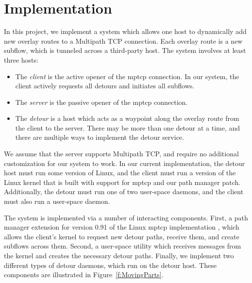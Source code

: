 \documentclass{cwru}
\begin{document}
\chapter{Implementation}
\label{c:impl}


In this project, we implement a system which allows one host to dynamically add
new overlay routes to a Multipath TCP connection. Each overlay route is a new
subflow, which is tunneled across a third-party host. The system involves at
least three hosts:
\begin{itemize}
\item The \emph{client} is the active opener of the \ac{mptcp} connection. In
  our system, the client actively requests all detours and initiates all
  subflows.
\item The \emph{server} is the passive opener of the \ac{mptcp} connection.
\item The \emph{detour} is a host which acts as a waypoint along the overlay
  route from the client to the server. There may be more than one detour at a
  time, and there are multiple ways to implement the detour service.
\end{itemize}

We assume that the server supports Multipath TCP, and require no additional
customization for our system to work. In our current implementation, the detour
host must run some version of Linux, and the client must run a version of the
Linux kernel that is built with support for \ac{mptcp} and our path manager
patch. Additionally, the detour must run one of two user-space daemons, and the
client must also run a user-space daemon.

The system is implemented via a number of interacting components. First, a path
manager extension for version 0.91 of the Linux \ac{mptcp} implementation
\cite{mptcp}, which allows the client's kernel to request new detour paths,
receive them, and create subflows across them. Second, a user-space utility
which receives messages from the kernel and creates the necessary detour paths.
Finally, we implement two different types of detour daemons, which run on the
detour host. These components are illustrated in Figure~\ref{f:MovingParts}.
\end{document}
